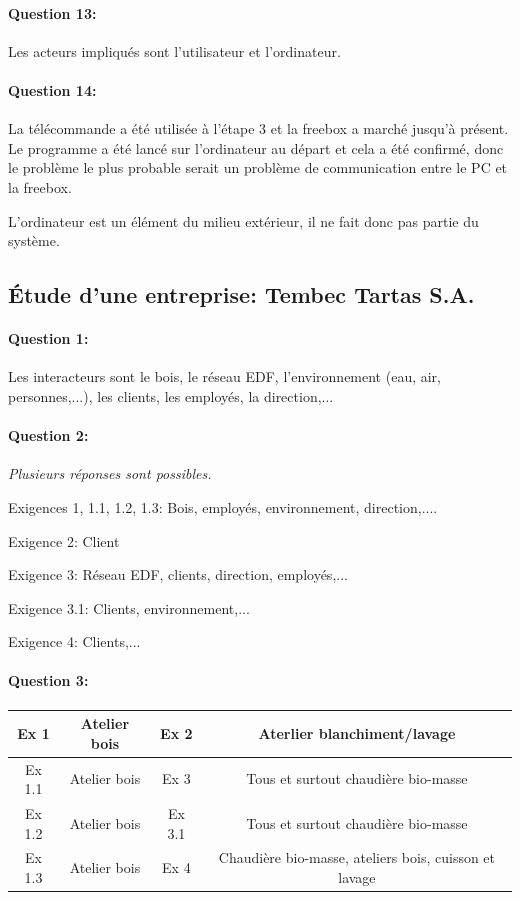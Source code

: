 \paragraph{Question 13:} Les acteurs impliqués sont l'utilisateur et l'ordinateur.

\paragraph{Question 14:} La télécommande a été utilisée à l'étape 3 et la freebox a marché jusqu'à présent. Le programme a été lancé sur l'ordinateur au départ et cela a été confirmé, donc le problème le plus probable serait un problème de communication entre le PC et la freebox.

L'ordinateur est un élément du milieu extérieur, il ne fait donc pas partie du système.

\subsection{Étude d'une entreprise: Tembec Tartas S.A.}

\paragraph{Question 1:} Les interacteurs sont le bois, le réseau EDF, l'environnement (eau, air, personnes,...), les clients, les employés, la direction,...

\paragraph{Question 2:} \textit{Plusieurs réponses sont possibles.}

Exigences 1, 1.1, 1.2, 1.3: Bois, employés, environnement, direction,....

Exigence 2: Client

Exigence 3: Réseau EDF, clients, direction, employés,...

Exigence 3.1: Clients, environnement,...

Exigence 4: Clients,...

\paragraph{Question 3:}

\begin{tabular}{|c|c|c|c|}
\hline
Ex 1 & Atelier bois & Ex 2 & Aterlier blanchiment/lavage \\
\hline
Ex 1.1 & Atelier bois & Ex 3 & Tous et surtout chaudière bio-masse \\
\hline
Ex 1.2 & Atelier bois & Ex 3.1 & Tous et surtout chaudière bio-masse \\
\hline
Ex 1.3 & Atelier bois & Ex 4 & Chaudière bio-masse, ateliers bois, cuisson et lavage \\
\hline
\end{tabular}

